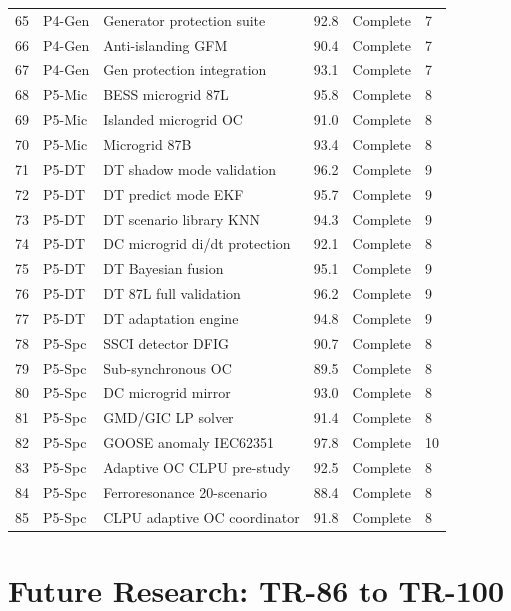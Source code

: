 \documentclass[11pt,a4paper]{report}
\newcommand{\cmark}{\ding{51}}
\begin{document}
\begin{longtable}{@{}p{0.7cm}p{1.2cm}p{4.5cm}p{1.3cm}p{1.5cm}p{1.0cm}@{}}
65 & P4-Gen & Generator protection suite & 92.8 & \cmark Complete & 7 \\
66 & P4-Gen & Anti-islanding GFM & 90.4 & \cmark Complete & 7 \\
67 & P4-Gen & Gen protection integration & 93.1 & \cmark Complete & 7 \\
68 & P5-Mic & BESS microgrid 87L & 95.8 & \cmark Complete & 8 \\
69 & P5-Mic & Islanded microgrid OC & 91.0 & \cmark Complete & 8 \\
70 & P5-Mic & Microgrid 87B & 93.4 & \cmark Complete & 8 \\
71 & P5-DT & DT shadow mode validation & 96.2 & \cmark Complete & 9 \\
72 & P5-DT & DT predict mode EKF & 95.7 & \cmark Complete & 9 \\
73 & P5-DT & DT scenario library KNN & 94.3 & \cmark Complete & 9 \\
74 & P5-DT & DC microgrid di/dt protection & 92.1 & \cmark Complete & 8 \\
75 & P5-DT & DT Bayesian fusion & 95.1 & \cmark Complete & 9 \\
76 & P5-DT & DT 87L full validation & 96.2 & \cmark Complete & 9 \\
77 & P5-DT & DT adaptation engine & 94.8 & \cmark Complete & 9 \\
78 & P5-Spc & SSCI detector DFIG & 90.7 & \cmark Complete & 8 \\
79 & P5-Spc & Sub-synchronous OC & 89.5 & \cmark Complete & 8 \\
80 & P5-Spc & DC microgrid mirror & 93.0 & \cmark Complete & 8 \\
81 & P5-Spc & GMD/GIC LP solver & 91.4 & \cmark Complete & 8 \\
82 & P5-Spc & GOOSE anomaly IEC62351 & 97.8 & \cmark Complete & 10 \\
83 & P5-Spc & Adaptive OC CLPU pre-study & 92.5 & \cmark Complete & 8 \\
84 & P5-Spc & Ferroresonance 20-scenario & 88.4 & \cmark Complete & 8 \\
85 & P5-Spc & CLPU adaptive OC coordinator & 91.8 & \cmark Complete & 8 \\
\end{longtable}
\normalsize

\chapter{Future Research: TR-86 to TR-100}
\label{ch:future}
\end{document}
